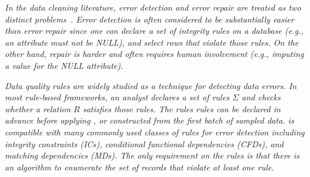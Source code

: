 \vspace{0.5em}

\emph{In the data cleaning literature, error detection and error repair are treated as two distinct problems~\cite{DBLP:series/synthesis/2012Fan, Dasu:2003:EDM:861869, rahm2000data}.
Error detection is often considered to be substantially easier than error repair since one can declare a set of integrity rules on a database (e.g., an attribute must not be NULL), and select rows that violate those rules.
On the other hand, repair is harder and often requires human involvement (e.g., imputing a value for the NULL attribute).}

\vspace{0.5em}

\emph{Data quality rules are widely studied as a technique for detecting data errors.
In most rule-based frameworks, an analyst declares a set of rules $\Sigma$ and checks whether a relation $R$ satisfies those rules. The rules rules can be declared in advance before applying \sys, or constructed from the first batch of sampled data.
\sys is compatible with many commonly used classes of rules for error detection including integrity constraints (ICs), conditional functional dependencies (CFDs), and matching dependencies (MDs).
The only requirement on the rules is that there is an algorithm to enumerate the set of records that violate at least one rule.}